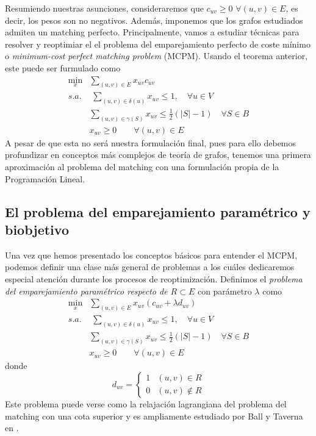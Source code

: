 \documentclass[twoside,a4paper,openright,12pt]{book}
\begin{document}
Resumiendo nuestras asunciones, consideraremos que $c_{uv}\geq 0$ $\forall (u,v)\in E$, es decir, los pesos son no negativos. Además, imponemos que los grafos estudiados admiten un matching perfecto. Principalmente, vamos a estudiar técnicas para resolver y reoptimiar el el problema del emparejamiento perfecto de coste mínimo o \textit{minimum-cost perfect matching problem} (MCPM). Usando el teorema anterior, este puede ser furmulado como
\begin{align*}
\min_x & \sum_{(u,v) \in E}x_{uv}c_{uv}\\
s.a.&\;\sum_{(u,v)\in\delta(u)} x_{uv} \leq 1, \quad \forall u \in V\\
&\sum_{(u,v)\in \gamma(S)} x_{uv} \leq \frac{1}{2}(|S|-1)\quad \forall S \in B	\\
&x_{uv} \geq 0 \qquad \forall(u,v)\in E
\end{align*}
A pesar de que esta no será nuestra formulación final, pues para ello debemos profundizar en conceptos más complejos de teoría de grafos, tenemos una primera aproximación al problema del matching con una formulación propia de la Programación Lineal. 
\subsection{El problema del emparejamiento paramétrico y biobjetivo}
Una vez que hemos presentado los conceptos básicos para entender el MCPM, podemos definir una clase más general de problemas a los cuáles dedicaremos especial atención durante los procesos de reoptimización. Definimos el \textit{problema del emparejamiento paramétrico respecto de $R\subset E$} con parámetro $\lambda$ como
\begin{align*}
\min_x & \sum_{(u,v) \in E}x_{uv} (c_{uv} + \lambda d_{uv})\\
s.a.&\;\sum_{(u,v)\in\delta(u)} x_{uv} \leq 1, \quad \forall u \in V\\
&\sum_{(u,v)\in \gamma(S)} x_{uv} \leq \frac{1}{2}(|S|-1)\quad \forall S \in B	\\
&x_{uv} \geq 0 \qquad \forall(u,v)\in E
\end{align*}
donde 
$$
d_{uv} = \begin{cases}
1 & (u,v)\in R\\
0 & (u,v)\notin R
\end{cases}
$$
Este problema puede verse como la relajación lagrangiana del problema del matching con una cota superior y es ampliamente estudiado por Ball y Taverna en \cite{balltab}. 
\end{document}
